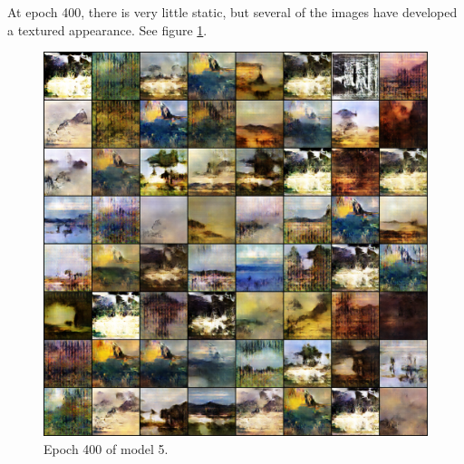 \documentclass[11pt,letterpaper]{article}
\begin{document}
				At epoch 400, there is very little static, but several of the images have developed a textured appearance.
				See figure \ref{fig:wa128:epoch400generator}.
				\begin{figure}
					\centering
					\includegraphics[width=1.0\linewidth]{results/model5/epoch400_generator}
					\caption{Epoch 400 of model 5.}
					\label{fig:wa128:epoch400generator}
				\end{figure}
\end{document}
